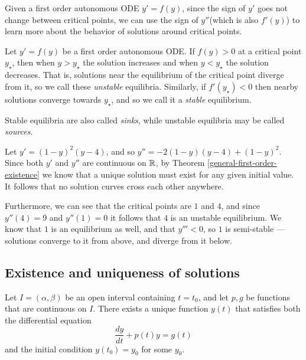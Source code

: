 \begin{rmk}
    Given a first order autonomous ODE $y' = f(y)$, since the sign of $y'$ goes not change between critical points, we can use the sign of $y''$(which is also $f'(y)$) to learn more about the behavior of solutions around critical points.
\end{rmk}

\begin{defn}
    Let $y' = f(y)$ be a first order autonomous ODE. If $f(y) > 0$ at a critical point $y_{\star}$, then when $y > y_{\star}$ the solution increases and when $y < y_{\star}$ the solution decreases. That is, solutions near the equilibrium of the critical point diverge from it, so we call these \emph{unstable} equilibria. Similarly, if $f'(y_{\star}) < 0$ then nearby solutions converge towards $y_{\star}$, and so we call it a \emph{stable} equilibrium.
\end{defn}

\begin{rmk}
    Stable equilibria are also called \emph{sinks}, while unstable equilibria may be called \emph{sources}.
\end{rmk}

\begin{exmp}
    Let $y' = (1-y)^2(y-4)$, and so $y'' = -2(1-y)(y-4) + (1-y)^2$. Since both $y'$ and $y''$ are continuous on $\mathbb{R}$, by Theorem \ref{general-first-order-existence} we know that a unique solution must exist for any given initial value. It follows that no solution curves cross each other anywhere.

    Furthermore, we can see that the critical points are $1$ and $4$, and since $y''(4) = 9$ and $y''(1) = 0$ it follows that $4$ is an unstable equilibrium. We know that $1$ is an equilibrium as well, and that $y''' < 0$, so $1$ is semi-stable --- solutions converge to it from above, and diverge from it below.
\end{exmp}

\subsection{Existence and uniqueness of solutions}

\begin{thm}\label{linear-first-order-existence}
    Let $I = (\alpha, \beta)$ be an open interval containing $t = t_0$, and let $p, g$ be functions that are continuous on $I$. There exists a unique function $y(t)$ that satisfies both the differential equation
    \[\frac{dy}{dt} + p(t)y = g(t)\] and the initial condition $y(t_0) = y_0$ for some $y_0$.
\end{thm}

